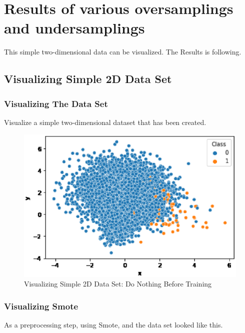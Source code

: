 \section{Results of various oversamplings and undersamplings}
This simple two-dimensional data can be visualized. The Results is following.

\clearpage

\subsection{Visualizing Simple 2D Data Set}
\subsubsection{Visualizing The Data Set}
Visualize a simple two-dimensional dataset that has been created.

\begin{center}
    \begin{figure}[ht]
        \caption{Visualizing Simple 2D Data Set: Do Nothing Before Training}
        \label{tab:team-rating-features}
        \begin{center}
            \includegraphics[scale=0.6]{image/no-prepro.eps}
        \end{center}
    \end{figure}
\end{center}

\clearpage
\subsubsection{Visualizing Smote}
As a preprocessing step, using Smote, and the data set looked like this.

